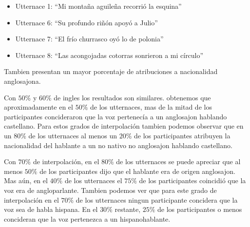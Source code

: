 \begin{itemize}
\item Utternace 1: ``Mi montaña aguileña recorrió la esquina'' 
\item Utternace 6: ``Su profundo riñón apoyó a Julio''
\item Utternace 7: ``El frío churrasco oyó lo de polonia''
\item Utternace 8: ``Las acongojadas cotorras sonrieron a mi círculo''
\end{itemize}

Tambien presentan un mayor porcentaje de atribuciones a nacionalidad anglosajona.

Con $50\%$ y $60\%$ de ingles los resultados son similares. obtenemos que aproximadamente en el $50\%$ de los utternaces, mas de la mitad de los participantes concideraron que la voz pertenecía a un anglosajon hablando castellano. Para estos grados de interpolación tambien podemos observar que en un $80\%$ de los utternaces al menos un $20\%$ de los participantes atribuyen la nacionalidad del hablante a un no nativo no anglosajon hablando castellano.

Con $70\%$ de interpolación, en el $80\%$ de los utternaces se puede apreciar que al menos $50\%$ de los participantes dijo que el hablante era de origen anglosajon. Mas aún, en el $40\%$ de los utternaces el $75\%$ de los participantes coincidió que la voz era de angloparlante. Tambien podemos ver que para este grado de interpolación en el $70\%$ de los utternaces ningun participante concidera que la voz sea de habla hispana. En el $30\%$ restante, $25\%$ de los participantes o menos concideran que la voz pertenezca a un hispanohablante.





